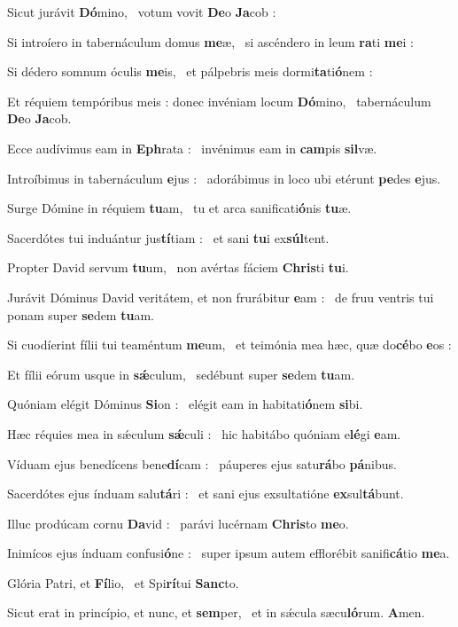 \documentclass[12pt]{article} %
\newenvironment{psalmtext}{\leftskip 0.25in}{\vspace{2 mm}}
\let\oldgresixstar\gresixstar
\renewcommand{\gresixstar}{\textcolor{benred8}{\oldgresixstar}}
\begin{document}
\begin{psalmtext}
Sicut jurávit \textbf{Dó}mino, \gresixstar\ votum vovit \textbf{De}o \textbf{Ja}cob :

Si introíero in tabernáculum domus \textbf{me}æ, \gresixstar\ si ascéndero in leum \textbf{ra}ti \textbf{me}i :

Si dédero somnum óculis \textbf{me}is, \gresixstar\ et pálpebris meis dormi\textbf{ta}ti\textbf{ó}nem :

Et réquiem tempóribus meis : donec invéniam locum \textbf{Dó}mino, \gresixstar\ tabernáculum \textbf{De}o \textbf{Ja}cob.

Ecce audívimus eam in \textbf{Eph}rata : \gresixstar\ invénimus eam in \textbf{cam}pis \textbf{sil}væ.

Introíbimus in tabernáculum \textbf{e}jus : \gresixstar\ adorábimus in loco ubi etérunt \textbf{pe}des \textbf{e}jus.

Surge Dómine in réquiem \textbf{tu}am, \gresixstar\ tu et arca sanificati\textbf{ó}nis \textbf{tu}æ.

Sacerdótes tui induántur jus\textbf{tí}tiam : \gresixstar\ et sani \textbf{tu}i ex\textbf{súl}tent.

Propter David servum \textbf{tu}um, \gresixstar\ non avértas fáciem \textbf{Chris}ti \textbf{tu}i.

Jurávit Dóminus David veritátem, et non frurábitur \textbf{e}am : \gresixstar\ de fruu ventris tui ponam super \textbf{se}dem \textbf{tu}am.

Si cuodíerint fílii tui teaméntum \textbf{me}um, \gresixstar\ et teimónia mea hæc, quæ do\textbf{cé}bo \textbf{e}os :

Et fílii eórum usque in \textbf{sǽ}culum, \gresixstar\ sedébunt super \textbf{se}dem \textbf{tu}am.

Quóniam elégit Dóminus \textbf{Si}on : \gresixstar\ elégit eam in habitati\textbf{ó}nem \textbf{si}bi.

Hæc réquies mea in sǽculum \textbf{sǽ}culi : \gresixstar\ hic habitábo quóniam e\textbf{lé}gi \textbf{e}am.

Víduam ejus benedícens bene\textbf{dí}cam : \gresixstar\ páuperes ejus satu\textbf{rá}bo \textbf{pá}nibus.

Sacerdótes ejus índuam salu\textbf{tá}ri : \gresixstar\ et sani ejus exsultatióne \textbf{ex}sul\textbf{tá}bunt.

Illuc prodúcam cornu \textbf{Da}vid : \gresixstar\ parávi lucérnam \textbf{Chris}to \textbf{me}o.

Inimícos ejus índuam confusi\textbf{ó}ne : \gresixstar\ super ipsum autem efflorébit sanifi\textbf{cá}tio \textbf{me}a.

Glória Patri, et \textbf{Fí}lio, \gresixstar\ et Spi\textbf{rí}tui \textbf{Sanc}to.

Sicut erat in princípio, et nunc, et\textbf{ sem}per, \gresixstar\ et in sǽcula sæcu\textbf{ló}rum. \textbf{A}men.

\end{psalmtext}
\end{document}

